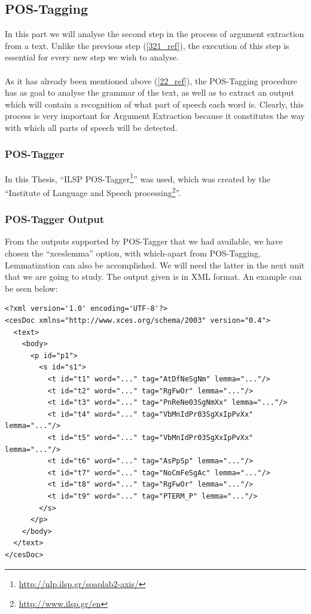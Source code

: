 \subsection{POS-Tagging}\label{322_ref}
In this part we will analyse the second step in the process of argument extraction from a text. Unlike the previous step (\ref{321_ref}), the execution of this step is essential for every new step we wish to analyse.\\
\\
As it has already been mentioned above (\ref{22_ref}), the POS-Tagging procedure has as goal to analyse the grammar of the text, as well as to extract an output which will contain a recognition of what part of speech each word is. Clearly, this process is very important for Argument Extraction because it constitutes the way with which all parts of speech will be detected.

\subsubsection{POS-Tagger}\label{3221_ref}
In this Thesis, ``ILSP POS-Tagger\footnote{\url{http://nlp.ilsp.gr/soaplab2-axis/}}'' was used, which was created by the ``Institute of Language and Speech processing\footnote{\url{http://www.ilsp.gr/en}}''.

\subsubsection{POS-Tagger Output}\label{3222_ref}
From the outputs supported by POS-Tagger that we had available, we have chosen the ``xceslemma'' option, with which-apart from POS-Tagging, Lemmatization can also be accomplished. We will need the latter in the next unit that we are going to study. The output given is in XML format. An example can be seen below:\\
\begin{lstlisting}[frame=single, basicstyle=\small]
<?xml version='1.0' encoding='UTF-8'?>
<cesDoc xmlns="http://www.xces.org/schema/2003" version="0.4">
  <text>
    <body>
      <p id="p1">
        <s id="s1">
          <t id="t1" word="..." tag="AtDfNeSgNm" lemma="..."/>
          <t id="t2" word="..." tag="RgFwOr" lemma="..."/>
          <t id="t3" word="..." tag="PnReNe03SgNmXx" lemma="..."/>
          <t id="t4" word="..." tag="VbMnIdPr03SgXxIpPvXx" lemma="..."/>
          <t id="t5" word="..." tag="VbMnIdPr03SgXxIpPvXx" lemma="..."/>
          <t id="t6" word="..." tag="AsPpSp" lemma="..."/>
          <t id="t7" word="..." tag="NoCmFeSgAc" lemma="..."/>
          <t id="t8" word="..." tag="RgFwOr" lemma="..."/>
          <t id="t9" word="..." tag="PTERM_P" lemma="..."/>
        </s>
      </p>
    </body>
  </text>
</cesDoc>
\end{lstlisting}

